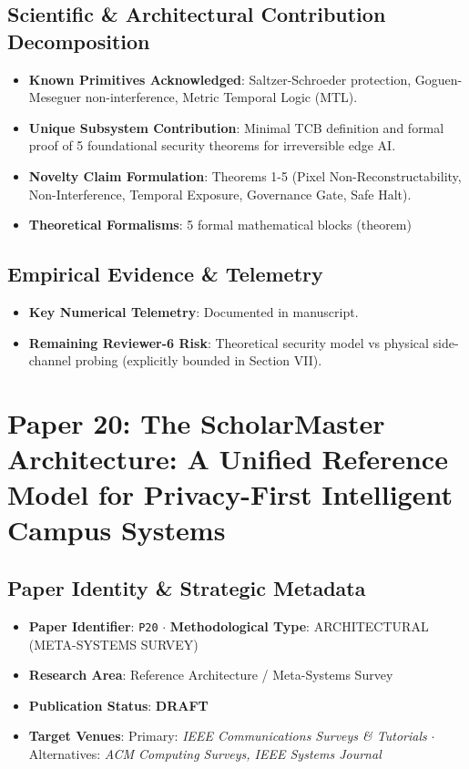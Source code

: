 \documentclass[11pt,a4paper]{article}
\begin{document}
\subsection*{Scientific & Architectural Contribution Decomposition}
\begin{itemize}[leftmargin=1.5em, itemsep=0.2em]
    \item \textbf{Known Primitives Acknowledged}: Saltzer-Schroeder protection, Goguen-Meseguer non-interference, Metric Temporal Logic (MTL).
    \item \textbf{Unique Subsystem Contribution}: Minimal TCB definition and formal proof of 5 foundational security theorems for irreversible edge AI.
    \item \textbf{Novelty Claim Formulation}: Theorems 1-5 (Pixel Non-Reconstructability, Non-Interference, Temporal Exposure, Governance Gate, Safe Halt).
    \item \textbf{Theoretical Formalisms}: 5 formal mathematical blocks (theorem)
\end{itemize}

\subsection*{Empirical Evidence & Telemetry}
\begin{itemize}[leftmargin=1.5em, itemsep=0.2em]
    \item \textbf{Key Numerical Telemetry}: Documented in manuscript.
    \item \textbf{Remaining Reviewer-6 Risk}: Theoretical security model vs physical side-channel probing (explicitly bounded in Section VII).
\end{itemize}

\section{Paper 20: The ScholarMaster Architecture: A Unified Reference Model for Privacy-First Intelligent Campus Systems}

\subsection*{Paper Identity \& Strategic Metadata}
\begin{itemize}[leftmargin=1.5em, itemsep=0.2em]
    \item \textbf{Paper Identifier}: \texttt{P20} $\cdot$ \textbf{Methodological Type}: ARCHITECTURAL (META-SYSTEMS SURVEY)
    \item \textbf{Research Area}: Reference Architecture / Meta-Systems Survey
    \item \textbf{Publication Status}: \textbf{DRAFT}
    \item \textbf{Target Venues}: Primary: \textit{IEEE Communications Surveys \& Tutorials} $\cdot$ Alternatives: \textit{ACM Computing Surveys, IEEE Systems Journal}
\end{itemize}
\end{document}
